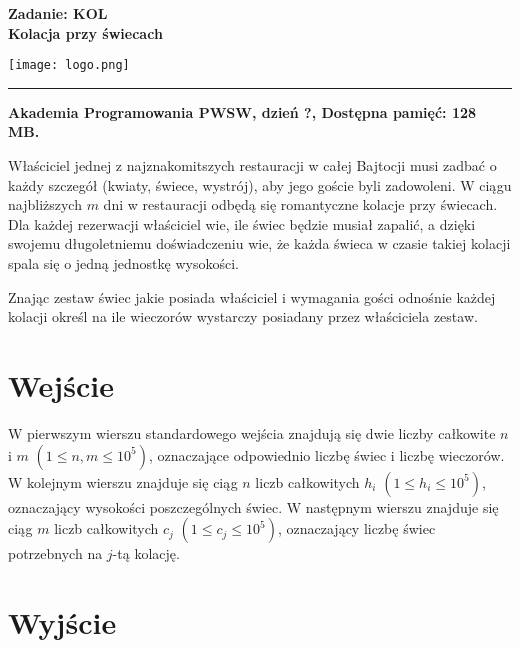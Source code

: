 \documentclass[10pt]{article}
\begin{document}
    

    \noindent
    \begin{minipage}{0.5\textwidth}
        \LARGE{\textsf{\textbf{Zadanie: KOL\\Kolacja przy świecach}}}
    \end{minipage}
    \begin{minipage}{0.5\textwidth}
        \begin{flushright}
            \texttt{[image: logo.png]}
        \end{flushright}
    \end{minipage}
    
    \noindent\rule{\textwidth}{0.4pt}
    
    \noindent\textbf{Akademia Programowania PWSW, dzień ?, Dostępna pamięć: 128 MB.}
    \vspace{1em}
    
    
    \noindent
    Właściciel jednej z najznakomitszych restauracji w całej Bajtocji musi zadbać o każdy szczegół (kwiaty, świece, wystrój), aby jego goście byli zadowoleni. W ciągu najbliższych $m$ dni w restauracji odbędą się romantyczne kolacje przy świecach. Dla każdej rezerwacji właściciel wie, ile świec będzie musiał zapalić, a dzięki swojemu długoletniemu doświadczeniu wie, że każda świeca w czasie takiej kolacji spala się o jedną jednostkę wysokości.
    
    Znając zestaw świec jakie posiada właściciel i wymagania gości odnośnie każdej kolacji określ na ile wieczorów wystarczy posiadany przez właściciela zestaw.


    \section*{Wejście}
    
    W pierwszym wierszu standardowego wejścia znajdują się dwie liczby całkowite $n$ i $m$ $(1\leq n, m\leq 10^{5})$, oznaczające odpowiednio liczbę świec i liczbę wieczorów. W kolejnym wierszu znajduje się ciąg $n$ liczb całkowitych $h_{i}$ $(1\leq h_{i}\leq 10^{5})$, oznaczający wysokości poszczególnych świec. W następnym wierszu znajduje się ciąg $m$ liczb całkowitych $c_{j}$ $(1\leq c_{j}\leq 10^{5})$, oznaczający liczbę świec potrzebnych na $j$-tą kolację.


    \section*{Wyjście}
    
\end{document}
